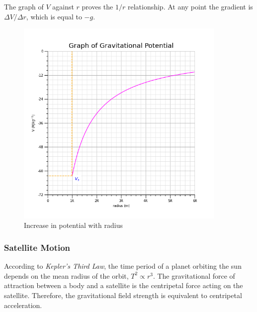\documentclass[12pt]{article}
\begin{document}
The graph of \(V\) against \(r\) proves the \(1/r\) relationship. At any point the gradient is \(\Delta V / \Delta r\), which is equal to \(-g\).

\begin{figure}[H]
\centering
\includegraphics[width=0.9\textwidth,keepaspectratio]{./images/gravitational_potential.png}
\caption{Increase in potential with radius}
\end{figure}

\subsubsection{Satellite Motion}
\label{sec:orgb160cc9}

According to \emph{Kepler's Third Law}, the time period of a planet orbiting the sun depends on the mean radius of the orbit,  \(T^2 \propto r^3\). The gravitational force of attraction between a body and a satellite is the centripetal force acting on the satellite. Therefore, the gravitational field strength is equivalent to centripetal acceleration.
\end{document}
